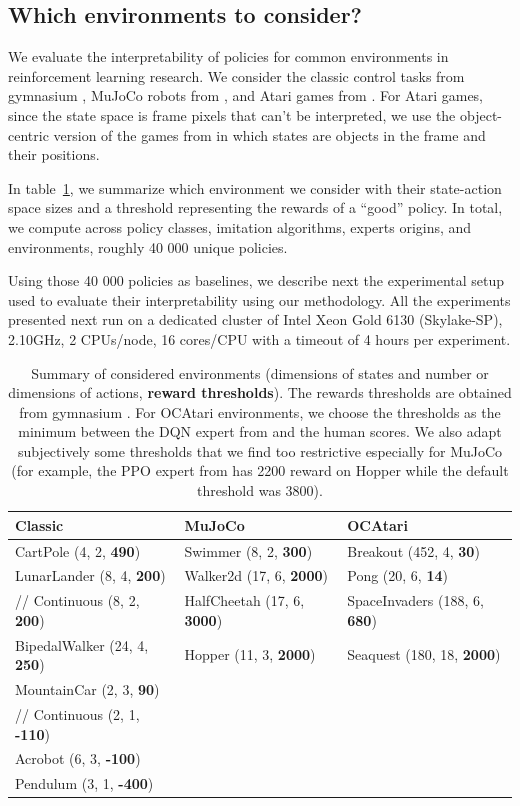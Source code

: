 \subsection{Which environments to consider?}
We evaluate the interpretability of policies for common environments in reinforcement learning research.
We consider the classic control tasks from gymnasium \cite{gymnasium}, MuJoCo robots from \cite{mujoco}, and Atari games from \cite{atari}.
For Atari games, since the state space is frame pixels that can't be interpreted, we use the object-centric version of the games from \cite{ocatari} in which states are objects in the frame and their positions.

In table~\ref{tab:envs}, we summarize which environment we consider with their state-action space sizes and a threshold representing the rewards of a ``good'' policy.
In total, we compute across policy classes, imitation algorithms, experts origins, and environments, roughly 40 000 unique policies.

Using those 40 000 policies as baselines, we describe next the experimental setup used to evaluate their interpretability using our methodology.
All the experiments presented next run on a dedicated cluster of Intel Xeon Gold 6130 (Skylake-SP), 2.10GHz, 2 CPUs/node, 16 cores/CPU with a timeout of 4 hours per experiment.

\begin{table}[ht]
  \centering
  \small
  \begin{tabular}{lll}
  \hline
  \textbf{Classic} & \textbf{MuJoCo} & \textbf{OCAtari}\\
  \hline
  CartPole (4, 2, \textbf{490}) & Swimmer (8, 2, \textbf{300}) & Breakout (452, 4, \textbf{30})\\
  LunarLander (8, 4, \textbf{200}) & Walker2d (17, 6, \textbf{2000}) & Pong (20, 6, \textbf{14})\\
  //    Continuous (8, 2, \textbf{200}) & HalfCheetah (17, 6, \textbf{3000}) & SpaceInvaders (188, 6, \textbf{680})\\
  BipedalWalker (24, 4, \textbf{250}) & Hopper (11, 3, \textbf{2000}) & Seaquest (180, 18, \textbf{2000})\\
  MountainCar (2, 3, \textbf{90}) & \\
  //    Continuous (2, 1, \textbf{-110}) & \\
  Acrobot (6, 3, \textbf{-100}) & \\
  Pendulum (3, 1, \textbf{-400}) & \\
  \hline
  \end{tabular}
  \caption{Summary of considered environments (dimensions of states and number or dimensions of actions, \textbf{reward thresholds}). The rewards thresholds are obtained from gymnasium \cite{gymnasium}. For OCAtari environments, we choose the thresholds as the minimum between the DQN expert from \cite{zoo} and the human scores. We also adapt subjectively some thresholds that we find too restrictive especially for MuJoCo (for example, the PPO expert from \cite{zoo} has 2200 reward on Hopper while the default threshold was 3800).}
  \label{tab:envs}
  \end{table}


